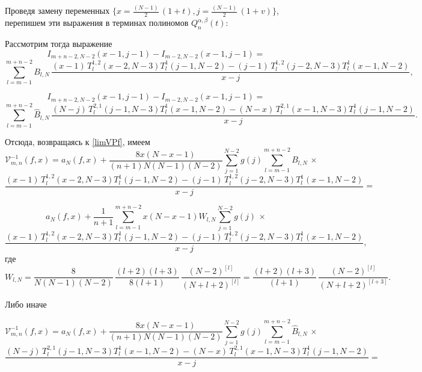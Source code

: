 \documentclass[12pt]{book}
\begin{document}
Проведя замену переменных $\{x = \frac{(N-1)}{2}\,(1+t), j = \frac{(N-1)}{2}\,(1+v)\}$, перепишем эти выражения в терминах полиномов $Q_n^{\alpha,\beta}(t)$:




Рассмотрим тогда выражение
\begin{equation*}
  I_{m+n-2,N-2}(x-1,j-1) - I_{m-2,N-2}(x-1,j-1) =
\end{equation*}
\begin{equation*}
\sum_{l=m-1}^{m+n-2}
  B_{l,N}\,
  \frac{(x-1)\,T^{1,2}_{l}(x-2,N-3) T_{l}^1(j-1,N-2) - (j-1)\,T^{1,2}_{l}(j-2,N-3) T_{l}^1(x-1,N-2)}{x-j},
\end{equation*}

\begin{equation*}
  I_{m+n-2,N-2}(x-1,j-1) - I_{m-2,N-2}(x-1,j-1) =
\end{equation*}
\begin{equation*}
\sum_{l=m-1}^{m+n-2}
  \hat{B}_{l,N}\,
  \frac{(N-j)\,T^{2,1}_{l}(j-1,N-3) T_{l}^1(x-1,N-2)
    - (N-x)\,T^{2,1}_{l}(x-1,N-3) T_{l}^1(j-1,N-2)}{x-j}.
\end{equation*}


Отсюда, возвращаясь к \eqref{limVPf}, имеем
\begin{equation*}
  \mathcal{V}^{-1}_{m,n}(f,x) = a_N(f,x) +
   \frac{8x(N-x-1)}{(n+1)N(N-1)(N-2)}
   \sum_{j=1}^{N-2} g(j) \sum_{l=m-1}^{m+n-2}
  B_{l,N}\,\times
\end{equation*}
\begin{equation*}
  \frac{(x-1)\,T^{1,2}_{l}(x-2,N-3) T_{l}^1(j-1,N-2) - (j-1)\,T^{1,2}_{l}(j-2,N-3) T_{l}^1(x-1,N-2)}{x-j} =
\end{equation*}

\begin{equation*}
  a_N(f,x) + \frac{1}{n+1}
   \sum_{l=m-1}^{m+n-2} x(N-x-1) W_{l,N} \sum_{j=1}^{N-2} g(j)
  \,\times
\end{equation*}
\begin{equation*}
  \frac{(x-1)\,T^{1,2}_{l}(x-2,N-3) T_{l}^1(j-1,N-2) - (j-1)\,T^{1,2}_{l}(j-2,N-3) T_{l}^1(x-1,N-2)}{x-j},
\end{equation*}
где
\begin{equation*}
 W_{l,N} = \frac{8}{N(N-1)(N-2)} \, \frac{(l+2)(l+3)}{8(l+1)}\, \frac{(N-2)^{[l]}}{(N+l+2)^{[l]}}
=
 \frac{(l+2)(l+3)}{(l+1)}\, \frac{(N-2)^{[l]}}{(N+l+2)^{[l+3]}}.
\end{equation*}

Либо иначе

\begin{equation*}
  \mathcal{V}^{-1}_{m,n}(f,x) = a_N(f,x) +
   \frac{8x(N-x-1)}{(n+1)N(N-1)(N-2)}
   \sum_{j=1}^{N-2} g(j) \sum_{l=m-1}^{m+n-2}
  \hat{B}_{l,N}\,\times
\end{equation*}
\begin{equation*}
  \frac{(N-j)\,T^{2,1}_{l}(j-1,N-3) T_{l}^1(x-1,N-2) - (N-x)\,T^{2,1}_{l}(x-1,N-3) T_{l}^1(j-1,N-2)}{x-j} =
\end{equation*}
\end{document}
